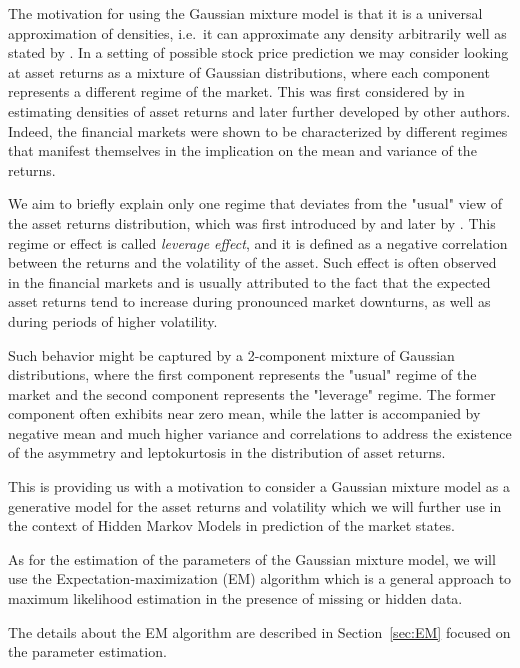 The motivation for using the Gaussian mixture model is that it is a universal approximation of densities, i.e.\ it can approximate any density arbitrarily well as stated by \citep{Bishop2006}.
In a setting of possible stock price prediction we may consider looking at asset returns as a mixture of Gaussian distributions, where each component represents a different regime of the market.
This was first considered by \citep{Fama1965} in estimating densities of asset returns and later further developed by other authors. Indeed, the financial markets were shown to be
characterized by different regimes that manifest themselves in the implication on the mean and variance of the returns.~\citep{Hamilton1989}

We aim to briefly explain only one regime that deviates from the "usual" view of the asset returns distribution, which was first 
introduced by \citep{Black1976} and later by \citep{Christie1982}. This regime or effect is called \textit{leverage effect}, 
and it is defined as a negative correlation between the returns and the volatility of the asset. Such effect is often observed in
the financial markets and is usually attributed to the fact that the expected asset returns tend to increase during 
pronounced market downturns, as well as during periods of higher volatility.~\citep{Aydemir2007}

Such behavior might be captured by a 2-component mixture of Gaussian distributions, where the first component represents the "usual" regime 
of the market and the second component represents the "leverage" regime. The former component often exhibits near zero mean, while the latter 
is accompanied by negative mean and much higher variance and correlations to address the existence of the asymmetry and leptokurtosis in the distribution of 
asset returns.~\citep{Paolella2015}

This is providing us with a motivation to consider a Gaussian mixture model as a generative model for the asset returns and volatility which 
we will further use in the context of Hidden Markov Models in prediction of the market states.

As for the estimation of the parameters of the Gaussian mixture model, we will use the Expectation-maximization (EM) algorithm which is a general
approach to maximum likelihood estimation in the presence of missing or hidden data.~\citep{Dempster1977}

The details about the EM algorithm are described in Section~\ref{sec:EM} focused on the parameter estimation.

